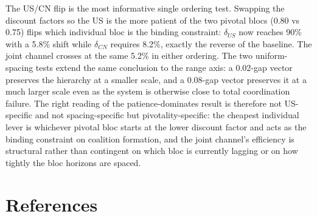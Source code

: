 \documentclass[10pt,a4paper]{article}
\begin{document}
The US/CN flip is the most informative single ordering test. Swapping the discount factors so the US is the more patient of the two pivotal blocs (0.80 vs 0.75) flips which individual bloc is the binding constraint: $\delta_{US}$ now reaches 90\% with a 5.8\% shift while $\delta_{CN}$ requires 8.2\%, exactly the reverse of the baseline. The joint channel crosses at the same 5.2\% in either ordering. The two uniform-spacing tests extend the same conclusion to the range axis: a 0.02-gap vector preserves the hierarchy at a smaller scale, and a 0.08-gap vector preserves it at a much larger scale even as the system is otherwise close to total coordination failure. The right reading of the patience-dominates result is therefore not US-specific and not spacing-specific but pivotality-specific: the cheapest individual lever is whichever pivotal bloc starts at the lower discount factor and acts as the binding constraint on coalition formation, and the joint channel's efficiency is structural rather than contingent on which bloc is currently lagging or on how tightly the bloc horizons are spaced.

\clearpage
\needspace{12em}
\section*{References}
\end{document}
